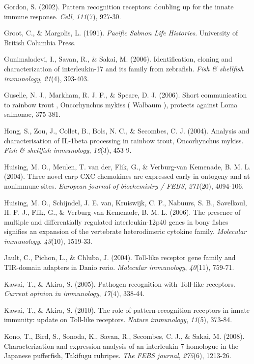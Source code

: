 \documentclass[12pt,letterpaper,oneside]{scrbook}
\begin{document}
Gordon, S. (2002). Pattern recognition receptors: doubling up for the
innate immune response. \emph{Cell}, \emph{111}(7), 927-30.

Groot, C., \& Margolis, L. (1991). \emph{Pacific Salmon Life Histories}.
University of British Columbia Press.

Gunimaladevi, I., Savan, R., \& Sakai, M. (2006). Identification,
cloning and characterization of interleukin-17 and its family from
zebrafish. \emph{Fish \& shellfish immunology}, \emph{21}(4), 393-403.

Guselle, N. J., Markham, R. J. F., \& Speare, D. J. (2006). Short
communication to rainbow trout , Oncorhynchus mykiss ( Walbaum ),
protects against Loma salmonae, 375-381.

Hong, S., Zou, J., Collet, B., Bols, N. C., \& Secombes, C. J. (2004).
Analysis and characterisation of IL-1beta processing in rainbow trout,
Oncorhynchus mykiss. \emph{Fish \& shellfish immunology}, \emph{16}(3),
453-9.

Huising, M. O., Meulen, T. van der, Flik, G., \& {Verburg-van Kemenade},
B. M. L. (2004). Three novel carp CXC chemokines are expressed early in
ontogeny and at nonimmune sites. \emph{European journal of biochemistry
/ FEBS}, \emph{271}(20), 4094-106.

Huising, M. O., Schijndel, J. E. van, Kruiswijk, C. P., Nabuurs, S. B.,
Savelkoul, H. F. J., Flik, G., \& {Verburg-van Kemenade}, B. M. L.
(2006). The presence of multiple and differentially regulated
interleukin-12p40 genes in bony fishes signifies an expansion of the
vertebrate heterodimeric cytokine family. \emph{Molecular immunology},
\emph{43}(10), 1519-33.

Jault, C., Pichon, L., \& Chluba, J. (2004). Toll-like receptor gene
family and TIR-domain adapters in Danio rerio. \emph{Molecular
immunology}, \emph{40}(11), 759-71.

Kawai, T., \& Akira, S. (2005). Pathogen recognition with Toll-like
receptors. \emph{Current opinion in immunology}, \emph{17}(4), 338-44.

Kawai, T., \& Akira, S. (2010). The role of pattern-recognition
receptors in innate immunity: update on Toll-like receptors.
\emph{Nature immunology}, \emph{11}(5), 373-84.

Kono, T., Bird, S., Sonoda, K., Savan, R., Secombes, C. J., \& Sakai, M.
(2008). Characterization and expression analysis of an interleukin-7
homologue in the Japanese pufferfish, Takifugu rubripes. \emph{The FEBS
journal}, \emph{275}(6), 1213-26.
\end{document}
